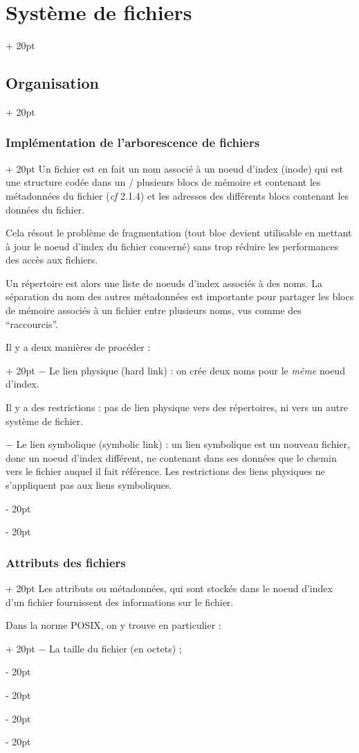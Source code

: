 \documentclass[a4paper, 12pt, twoside]{article}
\newcommand{\ind}[1][20pt]{\advance\leftskip + #1}
\newcommand{\deind}[1][20pt]{\advance\leftskip - #1}
\newenvironment{indentedenv}[1][20pt]{\par \ind[#1]}{\par \deind}
\newenvironment{indt}[2][20pt]{#2 \begin{indentedenv}[#1]}{\end{indentedenv}} %
\begin{document}
\begin{indt}{\section{Système de fichiers}}
\begin{indt}{\subsection{Organisation}}
\begin{indt}{\subsubsection{Implémentation de l'arborescence de fichiers}}
                Un fichier est en fait un nom associé à un noeud d'index (inode) qui est une structure codée dans un / plusieurs blocs de mémoire et contenant les métadonnées du fichier (\textit{cf} 2.1.4) et les adresses des différents blocs contenant les données du fichier.
                
                Cela résout le problème de fragmentation (tout bloc devient utilisable en mettant à jour le noeud d'index du fichier concerné) sans trop réduire les performances des accès aux fichiers.
                
                Un répertoire est alors une liste de noeuds d'index associés à des noms. La séparation du nom des autres métadonnées est importante pour partager les blocs de mémoire associés à un fichier entre plusieurs noms, vus comme des ``raccourcis''.
                
                \begin{indt}{Il y a deux manières de procéder :}
                    $-$ Le lien physique (hard link) : on crée deux noms pour le \textit{même} noeud d'index.
                    
                    Il y a des restrictions : pas de lien physique vers des répertoires, ni vers un autre système de fichier.
                    
                    \vspace{6pt}
                    
                    $-$ Le lien symbolique (symbolic link) :  un lien symbolique est un nouveau fichier, donc un noeud d'index différent, ne contenant dans ses données que le chemin vers le fichier auquel il fait référence. Les restrictions des liens physiques ne s'appliquent pas aux liens symboliques.
                \end{indt}
            \end{indt}
            
            \vspace{6pt}
            
            \begin{indt}{\subsubsection{Attributs des fichiers}}
                Les attributs ou métadonnées, qui sont stockés dans le noeud d'index d'un fichier fournissent des informations sur le fichier.
                
                \begin{indt}{Dans la norme POSIX, on y trouve en particulier :}
                    $-$ La taille du fichier (en octets) ;
                    

\end{indt}
\end{indt}
\end{indt}
\end{indt}
\end{document}
